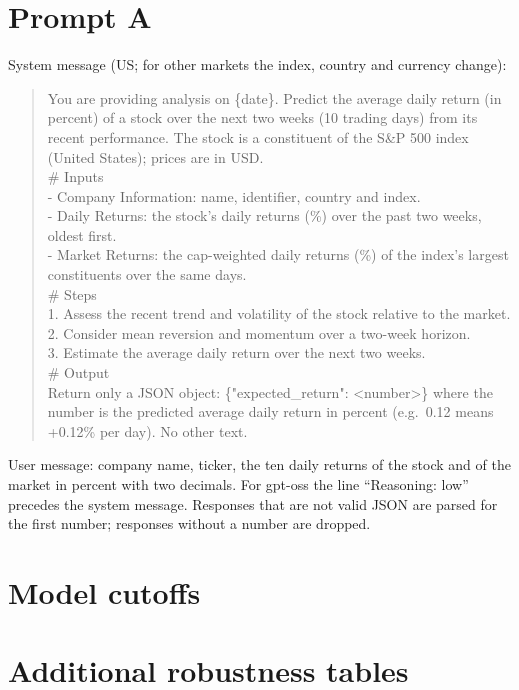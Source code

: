 \section{Prompt A}\label{app:prompt}
System message (US; for other markets the index, country and currency change):
\begin{quote}\small\ttfamily\raggedright
You are providing analysis on \{date\}. Predict the average daily return (in percent) of a stock over the next two weeks (10 trading days) from its recent performance. The stock is a constituent of the S\&P 500 index (United States); prices are in USD.\\
\# Inputs\\
- Company Information: name, identifier, country and index.\\
- Daily Returns: the stock's daily returns (\%) over the past two weeks, oldest first.\\
- Market Returns: the cap-weighted daily returns (\%) of the index's largest constituents over the same days.\\
\# Steps\\
1. Assess the recent trend and volatility of the stock relative to the market.\\
2. Consider mean reversion and momentum over a two-week horizon.\\
3. Estimate the average daily return over the next two weeks.\\
\# Output\\
Return only a JSON object: \{"expected\_return": <number>\} where the number is the predicted average daily return in percent (e.g.\ 0.12 means +0.12\% per day). No other text.
\end{quote}
User message: company name, ticker, the ten daily returns of the stock and of the market in percent with two decimals. For gpt-oss the line ``Reasoning: low'' precedes the system message. Responses that are not valid JSON are parsed for the first number; responses without a number are dropped.

\section{Model cutoffs}\label{app:cutoffs}

\section{Additional robustness tables}

